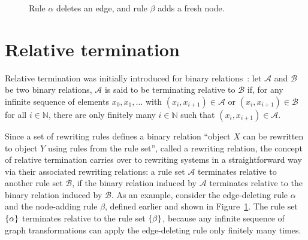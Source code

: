 \begin{figure}[H]
{{
            }
        }
    \caption{Rule $\alpha$ deletes an edge, and rule $\beta$ adds a fresh node.}
    \label{fig:intro:edge_deletion_and_node_addition_rule}
  \end{figure}


\section{Relative termination} 
Relative termination was initially introduced for binary relations~\cite{klop1987term}: let $\mathcal{A}$ and $\mathcal{B}$ be two binary relations, $\mathcal{A}$ is said to be terminating relative to $\mathcal{B}$ if, for any infinite sequence of elements \( x_0, x_1, \ldots \) with \( (x_i,x_{i+1}) \in \mathcal{A} \) or \( (x_i,x_{i+1}) \in \mathcal{B} \) for all \( i \in \mathbb{N} \), there are only finitely many \( i \in \mathbb{N} \) such that \( (x_i,x_{i+1}) \in \mathcal{A} \).

Since a set of rewriting rules defines a binary relation \enquote{object $X$ can be rewritten to object $Y$ using rules from the rule set}, called a rewriting relation,
the concept of relative termination
carries over to rewriting systems in a straightforward way via their associated rewriting relations: a rule set $\mathcal{A}$ terminates relative to another rule set $\mathcal{B}$, if the binary relation induced by $\mathcal{A}$ terminates relative to the binary relation induced by $\mathcal{B}$.
As an example, consider the edge-deleting rule $\alpha$ and the node-adding rule $\beta$, defined earlier and shown in Figure~\ref{fig:intro:edge_deletion_and_node_addition_rule}. 
The rule set $\{\alpha\}$ terminates relative to the rule set $\{\beta\}$, because any infinite sequence of graph transformations can apply the edge-deleting rule only finitely many times.


